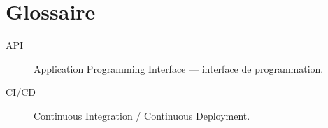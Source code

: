 \chapter*{Glossaire}

\begin{description}
  \item[API] Application Programming Interface — interface de programmation.
  \item[CI/CD] Continuous Integration / Continuous Deployment.
\end{description}
